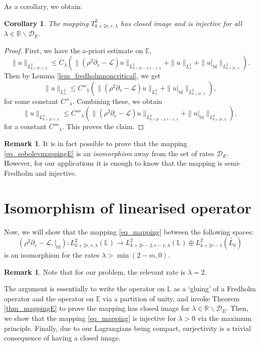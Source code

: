 \documentclass[10pt, a4paper]{article}
\theoremstyle{plain}%
\newtheorem{coro}[theorem]{Corollary}
\theoremstyle{definition}
\newtheorem{rem}[theorem]{Remark}
\numberwithin{figure}{section}
\numberwithin{equation}{section}
\newcommand{\bL}{\mathbb{L}}
\newcommand{\bR}{\mathbb{R}}
\newcommand{\bE}{\mathbb{E}}
\newcommand{\pa}{\partial}
\newcommand{\rt}{\rightarrow}
\newcommand{\cL}{\mathcal{L}}
\newcommand{\botf}{\textrm{bf}}
\newcommand{\cD}{\mathcal{D}}
\begin{document}
As a corollary, we obtain:
\begin{coro}\label{coro_semiFredholm}
	The mapping $T^2_{k+2r,r,\lambda}$ has closed image and is injective for all $\lambda \in \bR\backslash \cD_E$.
\end{coro}
\begin{proof}
	First, we have the a-priori estimate on $\bE$,
	\[
	\|u\|_{L^2_{k+2r,r,\lambda}}
	\leq C_{\lambda}\left(\|(\rho^2\pa_v-\cL)u\|_{L^2_{k+2r-2,r-1,\lambda}}+\|u\|_{L^2_\lambda}+\|u|_{\mathrm{bf}}\|_{L^2_{k+2r,\lambda}}\right).
	\]
	Then by Lemma \ref{lem_fredholmnoncritical}, we get \[
	\|u\|_{L^2_{\lambda}} \leq C''_\lambda(\|(\rho^2\pa_v - \cL)u\|_{L^2_{\lambda}}  +\|u|_{\textrm{bf}}\|_{L^2_{k+2r,\lambda}}),
	\]
	for some constant $C''_\lambda$. Combining these, we obtain \[
	\|u\|_{L^2_{k+2r,r,\lambda}}
	\leq C'''_{\lambda}\left(\|(\rho^2\pa_v-\cL)u\|_{L^2_{k+2r-2,r-1,\lambda}}+\|u|_{\mathrm{bf}}\|_{L^2_{k+2r,\lambda}}\right),
	\]
	for a constant $C'''_\lambda$. This proves the claim.
\end{proof}


\begin{rem}
	It is in fact possible to prove that the mapping \eqref{eq_sobolevmappingE} is an \textit{isomorphism} away from the set of rates $\cD_E$. However, for our applications it is enough to know that the mapping is semi-Fredholm and injective.
\end{rem}



\section{Isomorphism of linearised operator}\label{sec_linearproblem}
Now, we will show that the mapping \eqref{eq_mapping} between the following spaces: 
\begin{equation}\label{eq_sobolevmappingl2}
(\rho^2\pa_v - \cL,|_{\botf}) : L^2_{k+2r,r,\lambda}(\bL) \rt L^2_{k+2r-2,r-1,\lambda}(\bL)\oplus L^2_{k+2r-1}(\widetilde{L_0})
\end{equation} 
is an isomorphism for the rates $\lambda > \min(2-m,0)$. 
\begin{rem}Note that for our problem, the relevant rate is $\lambda=2$.
\end{rem}
 The argument is essentially to write the operator on $\bL$ as a `gluing' of a Fredholm operator and the operator on $\bE$ via a partition of unity, and invoke Theorem \ref{thm_mappingE} to prove the mapping has closed image for $\lambda \in \bR\backslash \cD_E$. Then, we show that the mapping \eqref{eq_mapping} is injective for $\lambda>0$ via the maximum principle. Finally, due to our Lagrangians being compact, surjectivity is a trivial consequence of having a closed image. 
\end{document}
